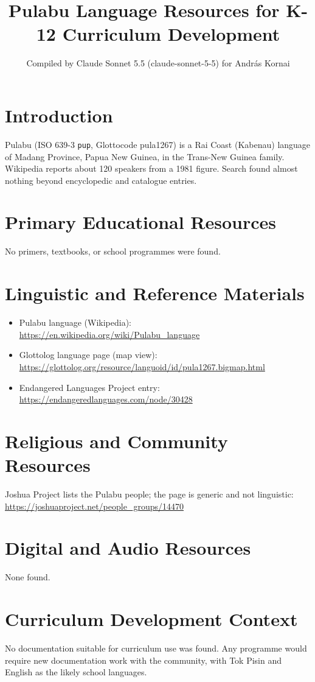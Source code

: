 \documentclass[12pt]{article}
\title{Pulabu Language Resources for K-12 Curriculum Development}
\author{Compiled by Claude Sonnet 5.5 (claude-sonnet-5-5) for Andr\'as Kornai}
\date{}
\begin{document}
\maketitle

\section{Introduction}
Pulabu (ISO 639-3 \texttt{pup}, Glottocode pula1267) is a Rai Coast (Kabenau) language of Madang Province, Papua New Guinea, in the Trans-New Guinea family. Wikipedia reports about 120 speakers from a 1981 figure. Search found almost nothing beyond encyclopedic and catalogue entries.

\section{Primary Educational Resources}
No primers, textbooks, or school programmes were found.

\section{Linguistic and Reference Materials}
\begin{itemize}
\item Pulabu language (Wikipedia): \url{https://en.wikipedia.org/wiki/Pulabu_language}
\item Glottolog language page (map view): \url{https://glottolog.org/resource/languoid/id/pula1267.bigmap.html}
\item Endangered Languages Project entry: \url{https://endangeredlanguages.com/node/30428}
\end{itemize}

\section{Religious and Community Resources}
Joshua Project lists the Pulabu people; the page is generic and not linguistic: \url{https://joshuaproject.net/people_groups/14470}

\section{Digital and Audio Resources}
None found.

\section{Curriculum Development Context}
No documentation suitable for curriculum use was found. Any programme would require new documentation work with the community, with Tok Pisin and English as the likely school languages.
\end{document}
